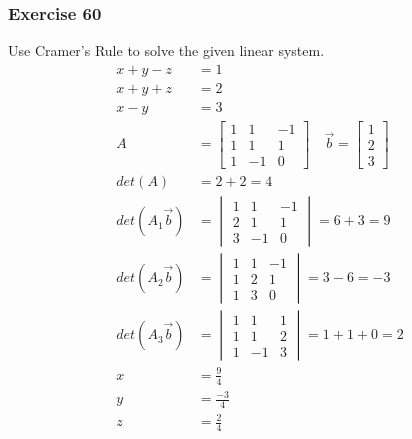 \documentclass{math}
\begin{document}
\subsubsection*{Exercise 60}
Use Cramer's Rule to solve the given linear system.
\begin{align*}
  x+y-z &= 1 \\
  x+y+z &= 2 \\
  x-y &= 3 \\
  A &= \begin{bmatrix}
    1 & 1 & -1 \\
    1 & 1 & 1 \\
    1 & -1 & 0
  \end{bmatrix}\quad \vec{b} = \begin{bmatrix}1 \\ 2 \\ 3\end{bmatrix} \\
  det(A) &= 2+2 = 4 \\
  det(A_1\vec{b}) &= \begin{vmatrix}
    1 & 1 & -1 \\
    2 & 1 & 1 \\
    3 & -1 & 0
  \end{vmatrix} = 6+3 = 9 \\
  det(A_2\vec{b}) &= \begin{vmatrix}
    1 & 1 & -1 \\
    1 & 2 & 1 \\
    1 & 3 & 0
  \end{vmatrix} = 3-6 = -3 \\
  det(A_3\vec{b}) &= \begin{vmatrix}
    1 & 1 & 1 \\
    1 & 1 & 2 \\
    1 & -1 & 3
  \end{vmatrix} = 1+1+0 = 2 \\
  x &= \frac{9}{4} \\
  y &= \frac{-3}{4} \\
  z &= \frac{2}{4}
\end{align*}
\end{document}
